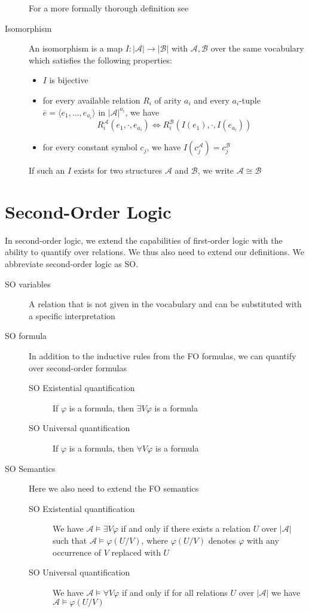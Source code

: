 \begin{description}
    For a more formally thorough definition see~\cite{descriptive-complexity}
    \item[Isomorphism] An isomorphism is a map $I: |\mathcal{A}| \to |\mathcal{B}|$ with $\mathcal{A}, \mathcal{B}$ over the same vocabulary which satisfies the following properties:
    \begin{itemize}
        \setlength\itemsep{0.2em}
        \item $I$ is bijective
        \item for every available relation $R_i$ of arity $a_i$ and every $a_i$-tuple $\overline{e} = \langle e_1, \dots, e_{a_i} \rangle$ in $|\mathcal{A}|^{a_i}$, we have \[R_i^{\mathcal{A}}(e_1, \cdot, e_{a_i}) \Leftrightarrow R_i^{\mathcal{B}}(I(e_1), \cdot, I(e_{a_i}))\]
        \item for every constant symbol $c_j$, we have $I(c_j^{\mathcal{A}}) = c_j^{\mathcal{B}}$
    \end{itemize}
    If such an $I$ exists for two structures $\mathcal{A}$ and $\mathcal{B}$, we write $\mathcal{A} \cong \mathcal{B}$
\end{description}


\section{Second-Order Logic}\label{sec:second-order-logic}
In second-order logic, we extend the capabilities of first-order logic with the ability to quantify over relations.
We thus also need to extend our definitions.
We abbreviate second-order logic as SO\@.
\begin{description}
    \item[SO variables] A relation that is not given in the vocabulary and can be substituted with a specific interpretation
    \item[SO formula] In addition to the inductive rules from the FO formulas, we can quantify over second-order formulas
    \begin{description}
        \item[SO Existential quantification] If $\varphi$ is a formula, then $\exists V\varphi$ is a formula
        \item[SO Universal quantification] If $\varphi$ is a formula, then $\forall V\varphi$ is a formula
    \end{description}
    \item[SO Semantics] Here we also need to extend the FO semantics
    \begin{description}
        \item[SO Existential quantification]  We have $\mathcal{A} \models \exists V\varphi$ if and only if there exists a relation $U$ over $|\mathcal{A}|$ such that $\mathcal{A} \models \varphi(U / V)$, where $\varphi(U / V)$ denotes $\varphi$ with any occurrence of $V$ replaced with $U$
        \item[SO Universal quantification] We have $\mathcal{A} \models \forall V\varphi$ if and only if for all relations $U$ over $|\mathcal{A}|$ we have $\mathcal{A} \models \varphi(U / V)$
    \end{description}
\end{description}


